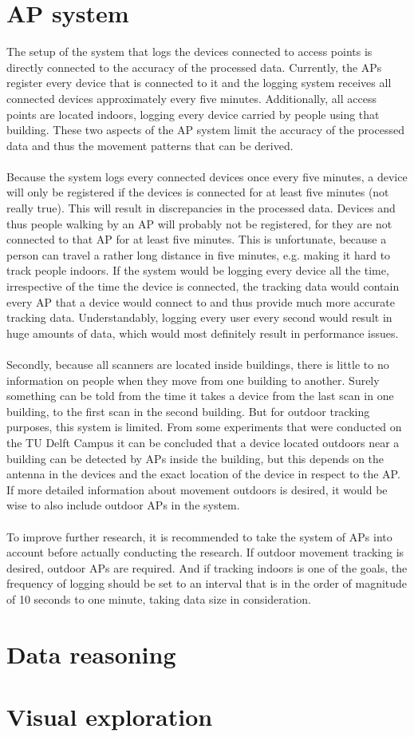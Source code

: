 \section{AP system}
The setup of the system that logs the devices connected to access points is directly connected to the accuracy of the processed data. Currently, the APs register every device that is connected to it and the logging system receives all connected devices approximately every five minutes. Additionally, all access points are located indoors, logging every device carried by people using that building. These two aspects of the AP system limit the accuracy of the processed data and thus the movement patterns that can be derived. \\\\
Because the system logs every connected devices once every five minutes, a device will only be registered if the devices is connected for at least five minutes (not really true). This will result in discrepancies in the processed data. Devices and thus people walking by an AP will probably not be registered, for they are not connected to that AP for at least five minutes. This is unfortunate, because a person can travel a rather long distance in five minutes, e.g. making it hard to track people indoors. If the system would be logging every device all the time, irrespective of the time the device is connected, the tracking data would contain every AP that a device would connect to and thus provide much more accurate tracking data. Understandably, logging every user every second would result in huge amounts of data, which would most definitely result in performance issues.\\\\
Secondly, because all scanners are located inside buildings, there is little to no information on people when they move from one building to another. Surely something can be told from the time it takes a device from the last scan in one building, to the first scan in the second building. But for outdoor tracking purposes, this system is limited. From some experiments that were conducted on the TU Delft Campus it can be concluded that a device located outdoors near a building can be detected by APs inside the building, but this depends on the antenna in the devices and the exact location of the device in respect to the AP. If more detailed information about movement outdoors is desired, it would be wise to also include outdoor APs in the system.\\\\
To improve further research, it is recommended to take the system of APs into account before actually conducting the research. If outdoor movement tracking is desired, outdoor APs are required. And if tracking indoors is one of the goals, the frequency of logging should be set to an interval that is in the order of magnitude of 10 seconds to one minute, taking data size in consideration.

\section{Data reasoning}

\section{Visual exploration}

